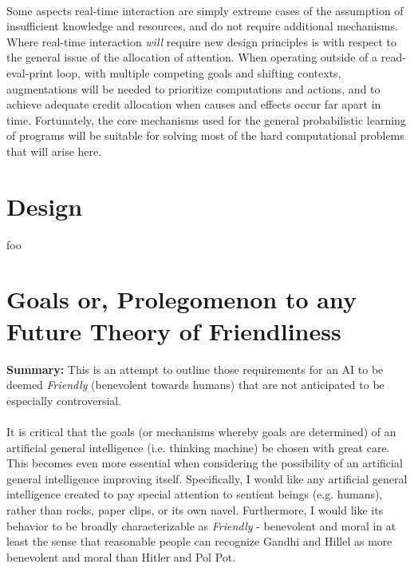 \documentclass[twoside,11pt]{article}
\begin{document}
\\ 
 Some aspects real-time interaction are simply extreme cases of the assumption of insufficient knowledge and resources, and do not require additional mechanisms. Where real-time interaction \emph{will}
 require new design principles is with respect to the general issue of the allocation of attention. When operating outside of a read-eval-print loop, with multiple competing goals and shifting contexts, augmentations will be needed to prioritize computations and actions, and to achieve adequate credit allocation when causes and effects occur far apart in time. Fortunately, the core mechanisms used for the general probabilistic learning of programs will be suitable for solving most of the hard computational problems that will arise here. \hline 

\section{Design}

foo~\cite{Solomonoff}

\section{Goals or, Prolegomenon to any Future Theory of Friendliness}

 \textbf{Summary:}
 This is an attempt to outline those requirements for an AI to be deemed \emph{Friendly}
 (benevolent towards humans) that are not anticipated to be especially controversial.
\\ 
\hline 
\\ 


 It is critical that the goals (or mechanisms whereby goals are determined) of an artificial general intelligence (i.e. thinking machine) be chosen with great care. This becomes even more essential when considering the possibility of an artificial general intelligence improving itself. Specifically, I would like any artificial general intelligence created to pay special attention to sentient beings (e.g. humans), rather than rocks, paper clips, or its own navel. Furthermore, I would like its behavior to be broadly characterizable as \emph{Friendly}
 - benevolent and moral in at least the sense that reasonable people can recognize Gandhi and Hillel as more benevolent and moral than Hitler and Pol Pot.\\ 
\\ 
\end{document}
